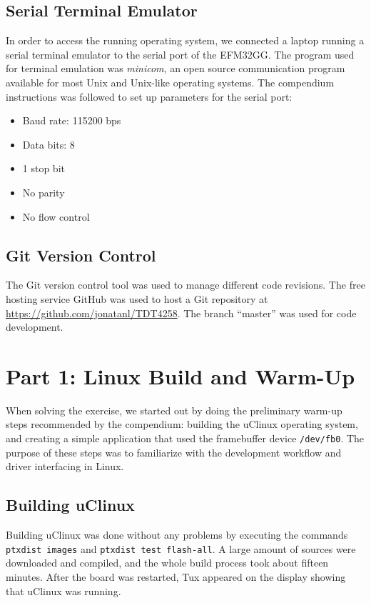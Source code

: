 \subsection{Serial Terminal Emulator}
In order to access the running operating system, we connected a laptop running a serial terminal emulator to the serial port of the EFM32GG. The program used for terminal emulation was \emph{minicom}, an open source communication program available for most Unix and Unix-like operating systems.\cite{minicom-man-page} The compendium instructions was followed to set up parameters for the serial port:
\begin{itemize}
  \item Baud rate: 115200 bps
  \item Data bits: 8
  \item 1 stop bit
  \item No parity
  \item No flow control
\end{itemize}

\subsection{Git Version Control}
The Git version control tool was used to manage different code revisions. The free hosting service GitHub was used to host a Git repository at \url{https://github.com/jonatanl/TDT4258}. The branch ``master'' was used for code development.


\section{Part 1: Linux Build and Warm-Up}
When solving the exercise, we started out by doing the preliminary warm-up steps recommended by the compendium: building the uClinux operating system, and creating a simple application that used the framebuffer device \texttt{/dev/fb0}. The purpose of these steps was to familiarize with the development workflow and driver interfacing in Linux.

\subsection{Building uClinux}
Building uClinux was done without any problems by executing the commands \texttt{ptxdist images} and \texttt{ptxdist test flash-all}. A large amount of sources were downloaded and compiled, and the whole build process took about fifteen minutes. After the board was restarted, Tux appeared on the display showing that uClinux was running.

